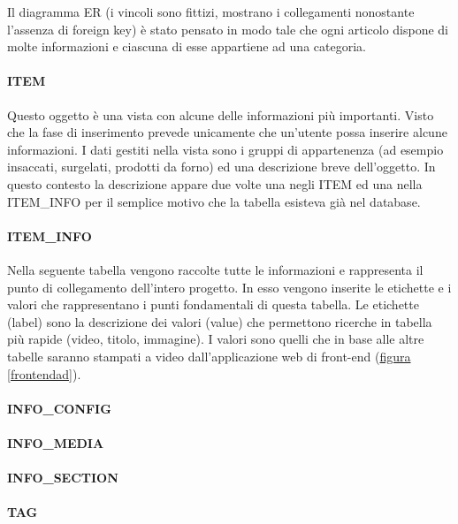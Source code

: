Il diagramma ER (i vincoli sono fittizi, mostrano i collegamenti nonostante l'assenza di foreign key) è stato pensato in modo tale che ogni articolo dispone di molte informazioni e ciascuna di esse appartiene ad una categoria.

\paragraph{ITEM}
Questo oggetto è una vista con alcune delle informazioni più importanti. Visto che la fase di inserimento prevede unicamente che un'utente possa inserire alcune informazioni. I dati gestiti nella vista sono i gruppi di appartenenza (ad esempio insaccati, surgelati, prodotti da forno) ed una descrizione breve dell'oggetto.
In questo contesto la descrizione appare due volte una negli ITEM ed una nella ITEM\_INFO per il semplice motivo che la tabella esisteva già nel database.

\paragraph{ITEM\_INFO}
Nella seguente tabella vengono raccolte tutte le informazioni e rappresenta il punto di collegamento dell'intero progetto. In esso vengono inserite le etichette e i valori che rappresentano i punti fondamentali di questa tabella. Le etichette (label) sono la descrizione dei valori (value) che permettono ricerche in tabella più rapide (video, titolo, immagine). I valori sono quelli che in base alle altre tabelle saranno stampati a video dall'applicazione web di front-end (\hyperref[frontend]{figura \ref{frontendad}}).

\paragraph{INFO\_CONFIG}

\paragraph{INFO\_MEDIA}

\paragraph{INFO\_SECTION}

\paragraph{TAG}

